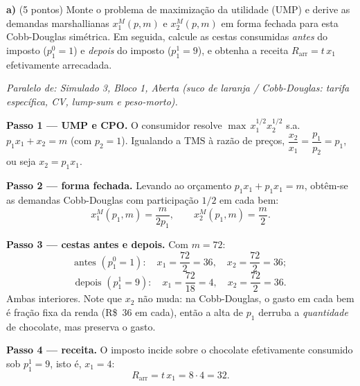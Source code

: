 \textbf{a)} (5 pontos) Monte o problema de maximização da utilidade (UMP) e derive as demandas marshallianas $x_1^{M}(p,m)$ e $x_2^{M}(p,m)$ em forma fechada para esta Cobb-Douglas simétrica. Em seguida, calcule as cestas consumidas \emph{antes} do imposto ($p_1^{0}=1$) e \emph{depois} do imposto ($p_1^{1}=9$), e obtenha a receita $R_{\text{arr}}=t\,x_1$ efetivamente arrecadada.
\resolucaobox{7.2cm}
\begin{solucao}
{\footnotesize\textit{Paralelo de: Simulado 3, Bloco 1, Aberta (suco de laranja / Cobb-Douglas: tarifa específica, CV, lump-sum e peso-morto).}}\par\vspace{0.2em}
\textbf{Passo 1 --- UMP e CPO.} O consumidor resolve $\max\,x_1^{1/2}x_2^{1/2}$ s.a. $p_1x_1+x_2=m$ (com $p_2=1$). Igualando a $\text{TMS}$ à razão de preços, $\dfrac{x_2}{x_1}=\dfrac{p_1}{p_2}=p_1$, ou seja $x_2=p_1x_1$.

\textbf{Passo 2 --- forma fechada.} Levando ao orçamento $p_1x_1+p_1x_1=m$, obtêm-se as demandas Cobb-Douglas com participação $1/2$ em cada bem:
\[
x_1^{M}(p_1,m)=\frac{m}{2p_1},\qquad x_2^{M}(p_1,m)=\frac{m}{2}.
\]

\textbf{Passo 3 --- cestas antes e depois.} Com $m=72$:
\[
\text{antes }(p_1^{0}=1):\quad x_1=\frac{72}{2}=36,\quad x_2=\frac{72}{2}=36;
\]
\[
\text{depois }(p_1^{1}=9):\quad x_1=\frac{72}{18}=4,\quad x_2=\frac{72}{2}=36.
\]
Ambas interiores. Note que $x_2$ não muda: na Cobb-Douglas, o gasto em cada bem é fração fixa da renda (R\$~36 em cada), então a alta de $p_1$ derruba a \emph{quantidade} de chocolate, mas preserva o gasto.

\textbf{Passo 4 --- receita.} O imposto incide sobre o chocolate efetivamente consumido sob $p_1^{1}=9$, isto é, $x_1=4$:
\[
R_{\text{arr}}=t\,x_1=8\cdot 4=32.
\]


\end{solucao}
